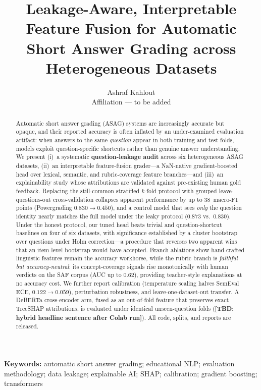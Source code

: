 \documentclass[11pt]{article}
\title{Leakage-Aware, Interpretable Feature Fusion for Automatic Short Answer
Grading across Heterogeneous Datasets}
\author{Ashraf Kahlout\\ \small Affiliation --- to be added}
\date{}
\newcommand{\TBD}[1]{\textbf{[TBD: #1]}}
\begin{document}
\maketitle

\begin{abstract}
Automatic short answer grading (ASAG) systems are increasingly accurate but
opaque, and their reported accuracy is often inflated by an under-examined
evaluation artifact: when answers to the same \emph{question} appear in both
training and test folds, models exploit question-specific shortcuts rather than
genuine answer understanding. We present (i)~a systematic \textbf{question-leakage
audit} across six heterogeneous ASAG datasets, (ii)~an interpretable
feature-fusion grader---a NaN-native gradient-boosted head over lexical,
semantic, and rubric-coverage feature branches---and (iii)~an explainability
study whose attributions are validated against pre-existing human gold feedback.
Replacing the still-common stratified $k$-fold protocol with grouped
leave-questions-out cross-validation collapses apparent performance by up to
38~macro-F1 points (Powergrading $0.830\!\rightarrow\!0.450$), and a control
model that sees \emph{only} the question identity nearly matches the full model
under the leaky protocol ($0.873$ vs.\ $0.830$). Under the honest protocol, our
tuned head beats trivial and question-shortcut baselines on four of six
datasets, with significance established by a cluster bootstrap over questions
under Holm correction---a procedure that reverses two apparent wins that an
item-level bootstrap would have accepted. Branch ablations show hand-crafted
linguistic features remain the accuracy workhorse, while the rubric branch is
\emph{faithful but accuracy-neutral}: its concept-coverage signals rise
monotonically with human verdicts on the SAF corpus (AUC up to $0.62$),
providing teacher-style explanations at no accuracy cost. We further report
calibration (temperature scaling halves SemEval ECE, $0.122\!\rightarrow\!0.059$),
perturbation robustness, and leave-one-dataset-out transfer.
A DeBERTa cross-encoder arm, fused as an out-of-fold feature that preserves
exact TreeSHAP attributions, is evaluated under identical unseen-question folds
(\TBD{hybrid headline sentence after Colab run}). All code, splits, and reports
are released.
\end{abstract}

\medskip
\noindent\textbf{Keywords:} automatic short answer grading; educational NLP;
evaluation methodology; data leakage; explainable AI; SHAP; calibration;
gradient boosting; transformers
\end{document}
